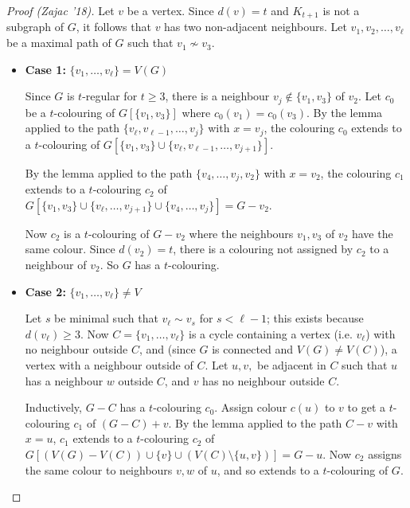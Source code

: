 \documentclass[main.tex]{subfiles}
\begin{document}
\begin{proof}[Proof (Zajac '18)]
  Let $v$ be a vertex.
  Since $d(v) = t$ and $K_{t+1}$ is not a subgraph of $G$, it follows that $v$
  has two non-adjacent neighbours.
  Let $v_1, v_2, \ldots, v_\ell$ be a maximal path of $G$ such that
  $v_1\not\sim v_3$.

  \begin{itemize}
    \item \textbf{Case 1:} $\{v_1,\ldots,v_\ell\} = V(G)$

      Since $G$ is $t$-regular for $t\geq 3$, there is a neighbour
      $v_j\notin\{v_1,v_3\}$ of $v_2$.
      Let $c_0$ be a $t$-colouring of $G[\{v_1,v_3\}]$ where $c_0(v_1) = c_0(v_3)$.
      By the lemma applied to the path $\{v_\ell, v_{\ell-1},\ldots,v_j\}$ with
      $x = v_j$, the colouring $c_0$ extends to a $t$-colouring of
      $G[\{v_1,v_3\}\cup\{v_\ell, v_{\ell-1},\ldots,v_{j+1}\}]$.

      By the lemma applied to the path $\{v_4, \ldots, v_j, v_2\}$ with $x = v_2$,
      the colouring $c_1$ extends to a $t$-colouring $c_2$ of
      $G[\{v_1,v_3\}\cup\{v_\ell,\ldots,v_{j+1}\}\cup\{v_4,\ldots,v_j\}] = G - v_2$.

      Now $c_2$ is a $t$-colouring of $G - v_2$ where the neighbours $v_1,v_3$
      of $v_2$ have the same colour.
      Since $d(v_2) = t$, there is a colouring not assigned by $c_2$ to a
      neighbour of $v_2$.
      So $G$ has a $t$-colouring.

    \item \textbf{Case 2:} $\{v_1,\ldots,v_\ell\}\neq V$

      Let $s$ be minimal such that $v_\ell\sim v_s$ for $s < \ell - 1$;
      this exists because $d(v_\ell)\geq 3$.
      Now $C = \{v_1,\ldots,v_\ell\}$ is a cycle containing a vertex (i.e. $v_\ell$)
      with no neighbour outside $C$, and (since $G$ is connected and $V(G)\neq V(C)$),
      a vertex with a neighbour outside of $C$.
      Let $u,v,$ be adjacent in $C$ such that
      $u$ has a neighbour $w$ outside $C$, and $v$ has no neighbour outside $C$.

      Inductively, $G - C$ has a $t$-colouring $c_0$.
      Assign colour $c(u)$ to $v$ to get a $t$-colouring $c_1$ of $(G - C) + v$.
      By the lemma applied to the path $C - v$ with $x = u$,
      $c_1$ extends to a $t$-colouring $c_2$ of
      $G[(V(G) - V(C))\cup\{v\}\cup(V(C)\setminus\{u,v\})] = G - u$.
      Now $c_2$ assigns the same colour to neighbours $v,w$ of $u$,
      and so extends to a $t$-colouring of $G$. \qedhere
  \end{itemize}
\end{proof}
\end{document}

